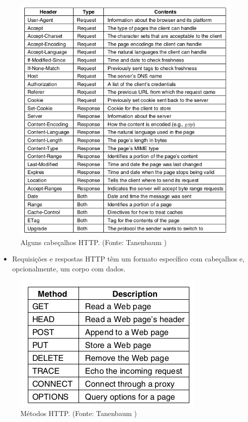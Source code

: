 \documentclass{article}
\begin{document}
\begin{figure}[H]
    \centering
    \includegraphics[width=\textwidth]{./assets/1312.png}
    \caption{Alguns cabeçalhos HTTP. (Fonte: Tanenbaum \cite{tanenbaum})}
\end{figure}

\begin{itemize}
    \item Requisições e respostas HTTP têm um formato específico com cabeçalhos e,
          opcionalmente, um corpo com dados.
\end{itemize}

\begin{figure}[H]
    \centering
    \includegraphics[width=\textwidth]{./assets/1035.png}
    \caption{Métodos HTTP. (Fonte: Tanenbaum \cite{tanenbaum})}
\end{figure}
\end{document}
